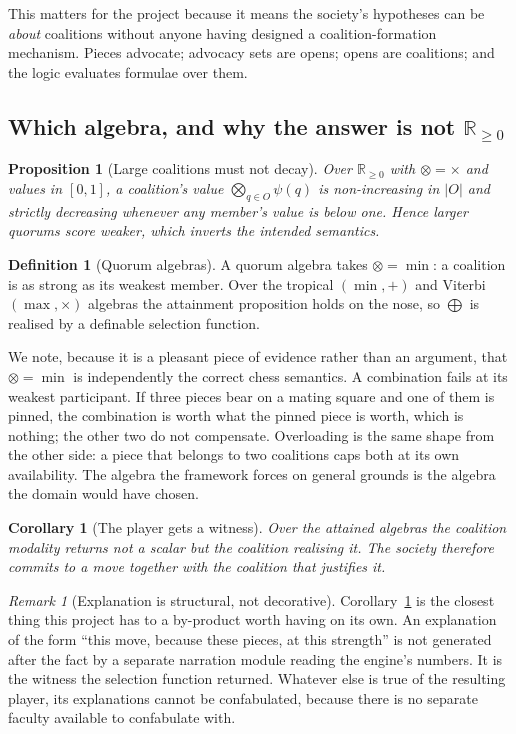 \documentclass[11pt,a4paper]{article}
\theoremstyle{plain}
\newtheorem{proposition}[theorem]{Proposition}
\newtheorem{corollary}[theorem]{Corollary}
\theoremstyle{definition}
\newtheorem{definition}[theorem]{Definition}
\theoremstyle{remark}
\newtheorem{remark}[theorem]{Remark}
\newcommand{\Rnn}{\mathbb{R}_{\geq 0}}
\begin{document}
This matters for the project because it means the society's hypotheses can be
\emph{about} coalitions without anyone having designed a coalition-formation
mechanism. Pieces advocate; advocacy sets are opens; opens are coalitions; and
the logic evaluates formulae over them.

\subsection{Which algebra, and why the answer is not $\Rnn$}

\begin{proposition}[Large coalitions must not decay]
\label{prop:decay}
Over $\Rnn$ with $\otimes = \times$ and values in $[0,1]$, a coalition's value
$\bigotimes_{q \in O}\psi(q)$ is non-increasing in $|O|$ and strictly decreasing
whenever any member's value is below one. Hence larger quorums score weaker,
which inverts the intended semantics.
\end{proposition}

\begin{definition}[Quorum algebras]
\label{def:quorum}
A quorum algebra takes $\otimes = \min$: a coalition is as strong as its weakest
member. Over the tropical $(\min,+)$ and Viterbi $(\max,\times)$ algebras the
attainment proposition holds on the nose, so $\bigoplus$ is realised by a
definable selection function.
\end{definition}

We note, because it is a pleasant piece of evidence rather than an argument, that
$\otimes = \min$ is independently the correct chess semantics. A combination
fails at its weakest participant. If three pieces bear on a mating square and one
of them is pinned, the combination is worth what the pinned piece is worth, which
is nothing; the other two do not compensate. Overloading is the same shape from
the other side: a piece that belongs to two coalitions caps both at its own
availability. The algebra the framework forces on general grounds is the algebra
the domain would have chosen.

\begin{corollary}[The player gets a witness]
\label{cor:witness}
Over the attained algebras the coalition modality returns not a scalar but the
coalition realising it. The society therefore commits to a move \emph{together
with the coalition that justifies it}.
\end{corollary}

\begin{remark}[Explanation is structural, not decorative]
\label{rem:explain}
Corollary~\ref{cor:witness} is the closest thing this project has to a
by-product worth having on its own. An explanation of the form ``this move,
because these pieces, at this strength'' is not generated after the fact by a
separate narration module reading the engine's numbers. It is the witness the
selection function returned. Whatever else is true of the resulting player, its
explanations cannot be confabulated, because there is no separate faculty
available to confabulate with.
\end{remark}
\end{document}
